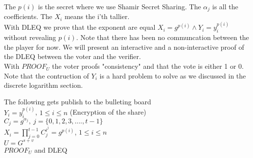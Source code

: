\noindent
{} The \begin{math}p(i)\end{math} is the secret where we use Shamir Secret Sharing. The \begin{math}\alpha_j\end{math} is all the coefficients. The \begin{math}X_i\end{math} means the i'th tallier. \\

\noindent
{} With DLEQ we prove that the exponent are equal \begin{math}X_i=g^{p(i)}  \land Y_i=y_i^{p(i)} \end{math} without revealing \begin{math}{p(i)} \end{math}. Note that there has been no communcation between the the player for now. We will present an interactive and a non-interactive proof of the DLEQ between the voter and the verifier.\\

\noindent
{} With \begin{math} PROOF_U \end{math} the voter proofs "consistency" and that the vote is either 1 or 0.\\

\noindent
Note that the contruction of $Y_i$ is a hard problem to solve as we discussed in the discrete logarithm section. 

\begin{infobox}
The following gets publish to the bulleting board\\
\begin{math}Y_i=y_i^{p(i)} \end{math}, \begin{math}1\leq i\leq n\end{math} (Encryption of the share) \\ 
\begin{math}C_j=g^{\alpha_j},\ j=\{0,1,2,3,....,t-1 \} \end{math} \\ 
\begin{math}X_i=\prod\limits_{j=0}^{t-1} C_j^{i^j} =g^{p(i)}\end{math}, \begin{math}1\leq i\leq n\end{math}\\
\begin{math}U=G^{s+v} \end{math}\\
\begin{math}PROOF_U \end{math} and DLEQ
\end{infobox}



